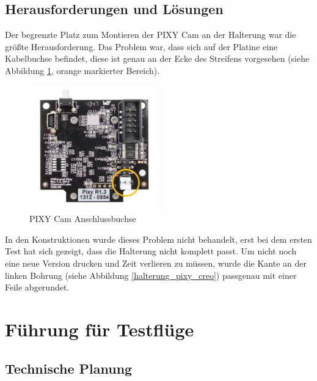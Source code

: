 			\newpage

	\subsection{Herausforderungen und Lösungen}

	Der begrenzte Platz zum Montieren der PIXY Cam an der Halterung war die größte Herausforderung.
	Das  Problem war, dass sich auf der Platine eine Kabelbuchse befindet, diese ist genau an der Ecke des Streifens vorgesehen (siehe Abbildung \ref{PIXY_Cam_Hinterseite}, orange markierter Bereich).

			\begin{figure}[H]
			\begin{centering}
			\includegraphics[width = 0.5\textwidth]{Bilder/PIXY_Cam_Hinterseite}
			\par\end{centering}
			\caption[PIXY Cam Anschlussbuchse]{PIXY Cam Anschlussbuchse\cite{PIXY_Cmu_cam5}}
			\label{PIXY_Cam_Hinterseite}
			\end{figure}

	In den Konstruktionen wurde dieses Problem nicht behandelt, erst bei dem ersten Test hat sich gezeigt, dass die Halterung nicht komplett passt.
	Um nicht noch eine neue Version drucken und Zeit verlieren zu müssen, wurde die Kante an der linken Bohrung (siehe Abbildung \ref{halterung_pixy_creo}) passgenau mit einer Feile abgerundet.

			\newpage

\section{Führung für Testflüge}

	\subsection{Technische Planung}

